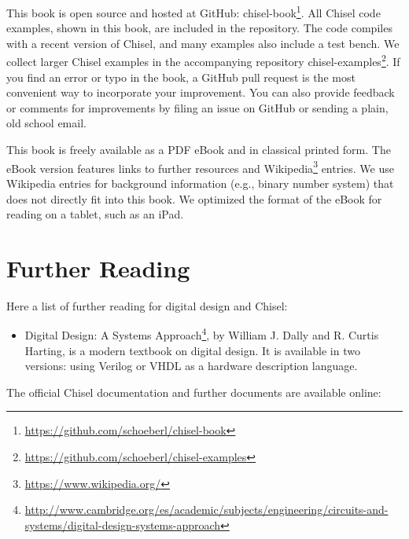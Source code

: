 \documentclass[%
    10pt,
    headinclude, footexclude,
    openright, %
    notitlepage,
    cleardoubleempty,
    headsepline,
    pointlessnumbers,
    bibtotoc, idxtotoc,
    ]{scrbook}
\newcommand{\myref}[2]{\href{#1}{#2}}
\renewcommand{\myref}[2]{{#2}{\footnote{\url{#1}}}}
\begin{document}
This book is open source and hosted at GitHub: \myref{https://github.com/schoeberl/chisel-book}{chisel-book}.
All Chisel code examples, shown in this book, are included in the repository.
The code compiles with a recent version of Chisel, and many examples also include a test bench.
We collect larger Chisel examples in the accompanying repository \myref{https://github.com/schoeberl/chisel-examples}{chisel-examples}. If you find an error or typo in the book, a GitHub pull request is the most convenient way to incorporate your improvement.
You can also provide feedback or comments for improvements by filing an issue on GitHub
or sending a plain, old school email.


This book is freely available as a PDF eBook and in classical printed form.
The eBook version features links to further resources
and \myref{https://www.wikipedia.org/}{Wikipedia} entries.
We use Wikipedia entries for background information (e.g., binary number system)
that does not directly fit into this book.
We optimized the format of the eBook for reading on a tablet, such as an iPad.

\section{Further Reading}

Here a list of further reading for digital design and Chisel:
\begin{itemize}
\item \myref{http://www.cambridge.org/es/academic/subjects/engineering/circuits-and-systems/digital-design-systems-approach}{Digital Design: A Systems Approach}, by William J. Dally and R. Curtis Harting,
is a modern textbook on digital design. It is available in two versions: using Verilog or VHDL as a hardware description language.
\end{itemize}

The official Chisel documentation and further documents are available online:
\end{document}

